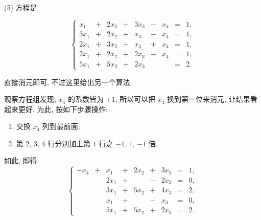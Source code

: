 (5) 方程是

\[
\left\{
\begin{alignedat}{5}
 x_1 &{}+{}& 2x_2 &{}+{}& 3x_3 &{}-{}& x_4 &{}={} & 1, \\
3x_1 &{}+{}& 2x_2 &{}+{}&  x_3 &{}-{}& x_4 &{}={} & 1, \\
2x_1 &{}+{}& 3x_2 &{}+{}&  x_3 &{}+{}& x_4 &{}={} & 1, \\
2x_1 &{}+{}& 2x_2 &{}+{}& 2x_3 &{}-{}& x_4 &{}={} & 1, \\
5x_1 &{}+{}& 5x_2 &{}+{}& 2x_3 &{} {}&     &{}={} & 2.
\end{alignedat}
\right.
\]

直接消元即可, 不过这里给出另一个算法.

观察方程组发现, $x_4$ 的系数皆为 $\pm 1$, 所以可以把 $x_4$ 换到第一位来消元, 让结果看起来更好. 为此, 按如下步骤操作:
\begin{enumerate}
    \item 交换 $x_4$ 列到最前面;
    \item 第 $2$, $3$, $4$ 行分别加上第 $1$ 行之 $-1$, $1$, $-1$ 倍. 
\end{enumerate}

如此, 即得
\[
\left\{
\begin{alignedat}{5}
-x_4 &{}+{}&  x_1 &{}+{}& 2x_2 &{}+{}& 3x_3 &{}={} & 1, \\
     &{} {}& 2x_1 &{}+{}&      &{}-{}& 2x_3 &{}={} & 0, \\
     &{} {}& 3x_1 &{}+{}& 5x_2 &{}+{}& 4x_3 &{}={} & 2, \\
     &{} {}&  x_1 &{}+{}&      &{}-{}&  x_3 &{}={} & 0, \\
     &{} {}& 5x_1 &{}+{}& 5x_2 &{}+{}& 2x_3 &{}={} & 2.
\end{alignedat}
\right.
\]

